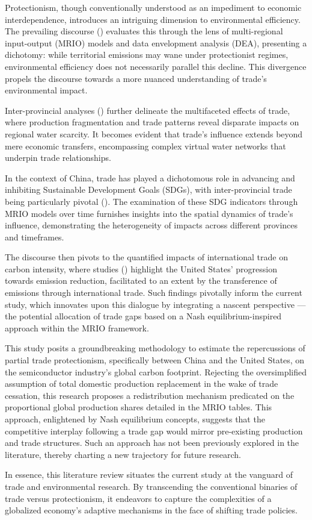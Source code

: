 Protectionism, though conventionally understood as an impediment to economic interdependence, introduces an intriguing dimension to environmental efficiency. The prevailing discourse () evaluates this through the lens of multi-regional input-output (MRIO) models and data envelopment analysis (DEA), presenting a dichotomy: while territorial emissions may wane under protectionist regimes, environmental efficiency does not necessarily parallel this decline. This divergence propels the discourse towards a more nuanced understanding of trade's environmental impact.

Inter-provincial analyses () further delineate the multifaceted effects of trade, where production fragmentation and trade patterns reveal disparate impacts on regional water scarcity. It becomes evident that trade's influence extends beyond mere economic transfers, encompassing complex virtual water networks that underpin trade relationships.

In the context of China, trade has played a dichotomous role in advancing and inhibiting Sustainable Development Goals (SDGs), with inter-provincial trade being particularly pivotal (). The examination of these SDG indicators through MRIO models over time furnishes insights into the spatial dynamics of trade's influence, demonstrating the heterogeneity of impacts across different provinces and timeframes.

The discourse then pivots to the quantified impacts of international trade on carbon intensity, where studies () highlight the United States' progression towards emission reduction, facilitated to an extent by the transference of emissions through international trade. Such findings pivotally inform the current study, which innovates upon this dialogue by integrating a nascent perspective — the potential allocation of trade gaps based on a Nash equilibrium-inspired approach within the MRIO framework.

This study posits a groundbreaking methodology to estimate the repercussions of partial trade protectionism, specifically between China and the United States, on the semiconductor industry's global carbon footprint. Rejecting the oversimplified assumption of total domestic production replacement in the wake of trade cessation, this research proposes a redistribution mechanism predicated on the proportional global production shares detailed in the MRIO tables. This approach, enlightened by Nash equilibrium concepts, suggests that the competitive interplay following a trade gap would mirror pre-existing production and trade structures. Such an approach has not been previously explored in the literature, thereby charting a new trajectory for future research.

In essence, this literature review situates the current study at the vanguard of trade and environmental research. By transcending the conventional binaries of trade versus protectionism, it endeavors to capture the complexities of a globalized economy's adaptive mechanisms in the face of shifting trade policies.
